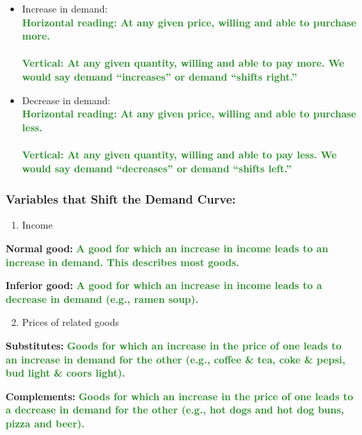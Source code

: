 \documentclass[11pt]{article}\usepackage[]{graphicx}\usepackage[]{color}
\theoremstyle{definition}
\newcommand{\ddp}[1]{{\textbf{\textcolor{ForestGreen}{#1}}}}
\newcommand{\defn}[1]{\textbf{#1}}
\begin{document}
	\begin{itemize}
	\setlength\itemsep{1.5em}
		\item Increase in demand: \ddp{ \\ Horizontal reading: At any given price, willing and able to purchase more. \\ \\ Vertical: At any given quantity, willing and able to pay more. We would say demand ``increases'' or demand ``shifts right.''}
		\item Decrease in demand: \ddp{\\ Horizontal reading: At any given price, willing and able to purchase less.\\ \\ Vertical: At any given quantity, willing and able to pay less. We would say demand ``decreases'' or demand ``shifts left.''}
	\end{itemize}
	
	\subsubsection*{Variables that Shift the Demand Curve:}

	\begin{enumerate}
		\item Income
	\end{enumerate}
	
	\hspace{.5cm} \defn{Normal good:} \ddp{A good for which an increase in income leads to an increase in demand. This describes most goods. \\}

	
	\hspace{.5cm} \defn{Inferior good:} \ddp{A good for which an increase in income leads to a decrease in demand (e.g., ramen soup).}

	
	\begin{enumerate}
		\setcounter{enumi}{1}
		\item Prices of related goods
	\end{enumerate}
	
	\hspace{.5cm} \defn{Substitutes:} \ddp{Goods for which an increase in the price of one leads to an increase in demand for the other (e.g., coffee \& tea, coke \& pepsi, bud light \& coors light). \\}
	
	\hspace{.5cm} \defn{Complements:} \ddp{Goods for which an increase in the price of one leads to a decrease in demand for the other (e.g., hot dogs and hot dog buns, pizza and beer).}
	
\end{document}
